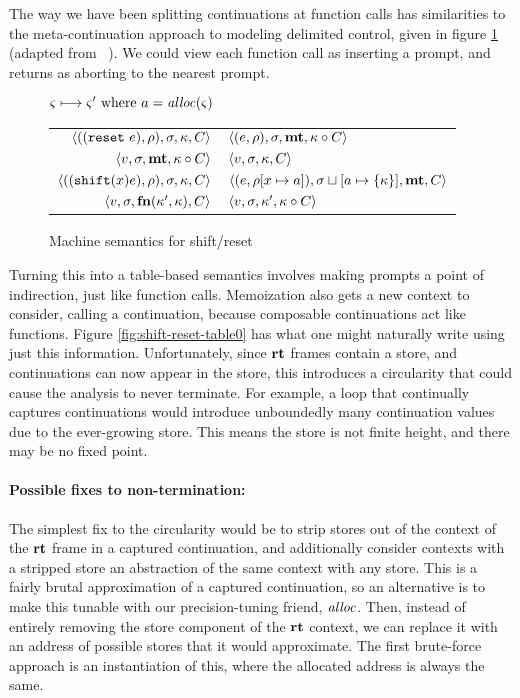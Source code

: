 \documentclass{llncs}
\begin{document}
The way we have been splitting continuations at function calls has
similarities to the meta-continuation approach to modeling delimited
control, given in figure \ref{fig:shift-reset} (adapted from
~\citep{ianjohnson:Biernacki2006274}). We could view each function call
as inserting a prompt, and returns as aborting to the nearest prompt.

\begin{figure}
  \centering
  $\varsigma \longmapsto \varsigma' \text{ where } a = \mathit{alloc}(\varsigma)$ \\
  \begin{tabular}{r|l}
    \hline
    $\langle ((\texttt{reset}\ e), \rho), \sigma, \kappa, C \rangle$
    &
    $\langle (e, \rho), \sigma, \mathbf{mt}, \kappa\circ C \rangle$
    \\
    $\langle v, \sigma, \mathbf{mt}, \kappa\circ C \rangle$
    &
    $\langle v, \sigma, {\kappa}, {C} \rangle$
    \\
    $\langle ((\texttt{shift} (x) e), \rho), \sigma, \kappa, C \rangle$
    &
    $\langle (e, \rho[x \mapsto a]), \sigma\sqcup[a \mapsto \{ \kappa \}],\mathbf{mt},C \rangle$
    \\
    $\langle v,\sigma,\mathbf{fn}{}(\kappa', \kappa), C \rangle$
    &
    $\langle v, \sigma, \kappa', \kappa\circ C \rangle$
  \end{tabular}  
  \caption{Machine semantics for shift/reset}
  \label{fig:shift-reset}
\end{figure}

Turning this into a table-based semantics involves making prompts a
point of indirection, just like function calls. Memoization also gets
a new context to consider, calling a continuation, because composable
continuations act like functions. Figure \ref{fig:shift-reset-table0}
has what one might naturally write using just this
information. Unfortunately, since $\mathbf{rt}$ frames contain a store, and
continuations can now appear in the store, this introduces a
circularity that could cause the analysis to never terminate. For
example, a loop that continually captures continuations would
introduce unboundedly many continuation values due to the ever-growing
store. This means the store is not finite height, and there may be no
fixed point.

\paragraph{Possible fixes to non-termination:} The simplest fix to the
circularity would be to strip stores out of the context of the $\mathbf{rt}$
frame in a captured continuation, and additionally consider contexts
with a stripped store an abstraction of the same context with any
store. This is a fairly brutal approximation of a captured
continuation, so an alternative is to make this tunable with our
precision-tuning friend, $\mathit{alloc}$. Then, instead of entirely removing
the store component of the $\mathbf{rt}$ context, we can replace it with an
address of possible stores that it would approximate. The first
brute-force approach is an instantiation of this, where the allocated
address is always the same.
\end{document}

